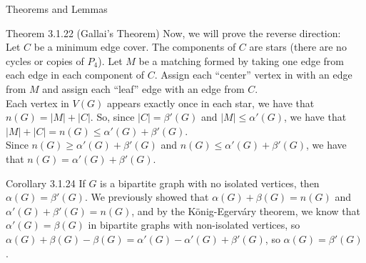 \documentclass[10pt]{extarticle}
\begin{document}
\begin{problem}{Theorems and Lemmas}
\begin{problem}{Theorem 3.1.22 (Gallai's Theorem)}
      \vspace{10pt}
      Now, we will prove the reverse direction:\\
      
      Let $C$ be a minimum edge cover. The components of $C$ are stars (there are no cycles or copies of $P_4$). Let $M$ be a matching formed by taking one edge from each edge in each component of $C$. Assign each ``center'' vertex in with an edge from $M$ and assign each ``leaf'' edge with an edge from $C$.\\

      Each vertex in $V(G)$ appears exactly once in each star, we have that $n(G) = |M| + |C|$. So, since $|C| = \beta'(G)$ and $|M| \leq \alpha'(G)$, we have that $|M| + |C| = n(G) \leq \alpha'(G) + \beta'(G)$.\\

      Since $n(G) \geq \alpha'(G) + \beta'(G)$ and $n(G) \leq \alpha'(G) + \beta'(G)$, we have that $n(G) = \alpha'(G) + \beta'(G)$.
    \end{problem}
    \begin{problem}{Corollary 3.1.24}
      If $G$ is a bipartite graph with no isolated vertices, then $\alpha(G) = \beta'(G)$.
      \tcblower
      We previously showed that $\alpha(G) + \beta(G) = n(G)$ and $\alpha'(G) + \beta'(G) = n(G)$, and by the König-Egerváry theorem, we know that $\alpha'(G) = \beta(G)$ in bipartite graphs with non-isolated vertices, so $\alpha(G) + \beta(G) - \beta(G) = \alpha'(G) - \alpha'(G) + \beta'(G)$, so $\alpha(G) = \beta'(G)$.
    \end{problem}
  \end{problem}
\end{document}
